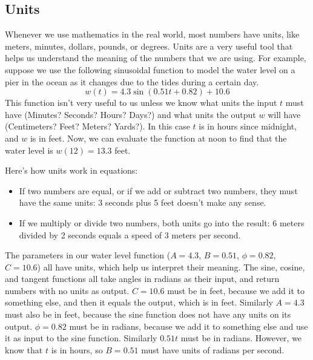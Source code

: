 \afterex








\subsection*{Units}

Whenever we use mathematics in the real world, most numbers have units, like meters,
minutes, dollars, pounds, or degrees.  Units are a very useful tool that helps us
understand the meaning of the numbers that we are using.  For example, suppose we use the
following sinusoidal function to model the water level on a pier in the ocean as it
changes due to the tides during a certain day.
\[ w(t) = 4.3 \sin \left( 0.51 t + 0.82 \right) + 10.6 \]
This function isn't very useful to us unless we know what units the input $t$ must have
(Minutes?  Seconds?  Hours?  Days?) and what units the output $w$ will have (Centimeters?
Feet?  Meters?  Yards?).  In this case $t$ is in hours since midnight, and $w$ is in feet.
Now, we can evaluate the function at noon to find that the water level is $w(12) = 13.3$
feet.

    Here's how units work in equations:  
    \begin{itemize}
        \item If two numbers are equal, or if we add or subtract
            two numbers, they must have the same units:  3 seconds plus 5 feet doesn't make any sense.
        \item If we multiply or divide two numbers, both units go into the result:  6 meters divided by
            2 seconds equals a speed of 3 meters per second. 
    \end{itemize}

The parameters in our water level function ($A = 4.3$, $B = 0.51$, $\phi = 0.82$, $C =
10.6$) all have units, which help us interpret their meaning.   The sine, cosine, and
tangent functions all take angles in radians as their input, and return numbers with no
units as output.  $C = 10.6$ must be in feet, because we add it to something else, and
then it equals the output, which is in feet.  Similarly $A = 4.3$ must also be in feet,
because the sine function does not have any units on its output.  $\phi = 0.82$ must be in
radians, because we add it to something else and use it as input to the sine function.
Similarly $0.51 t$ must be in radians.  However, we know that $t$ is in hours, so $B =
0.51$ must have units of radians per second.  





